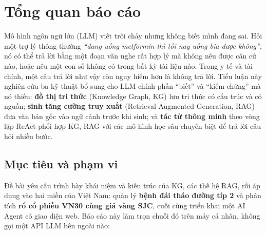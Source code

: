 \chapter*{Tổng quan báo cáo}

Mô hình ngôn ngữ lớn (LLM) viết trôi chảy nhưng không biết mình đang sai. Hỏi một trợ lý thông thường
\emph{``đang uống metformin thì tối nay uống bia được không''}, nó có thể trả lời bằng một đoạn văn nghe rất hợp
lý mà không nêu được căn cứ nào, hoặc nêu một con số không có trong bất kỳ tài liệu nào. Trong y tế và tài
chính, một câu trả lời như vậy còn nguy hiểm hơn là không trả lời. Tiểu luận này nghiên cứu ba kỹ thuật bổ sung
cho LLM chính phần ``biết'' và ``kiểm chứng'' mà nó thiếu: \textbf{đồ thị tri thức} (Knowledge Graph, KG) lưu tri
thức có cấu trúc và có nguồn; \textbf{sinh tăng cường truy xuất} (Retrieval-Augmented Generation, RAG) đưa văn
bản gốc vào ngữ cảnh trước khi sinh; và \textbf{tác tử thông minh} theo vòng lặp ReAct phối hợp KG, RAG với các
mô hình học sâu chuyên biệt để trả lời câu hỏi nhiều bước.

\section*{Mục tiêu và phạm vi}
Đề bài yêu cầu trình bày khái niệm và kiến trúc của KG, các thế hệ RAG, rồi áp dụng vào hai miền của Việt Nam:
quản lý \textbf{bệnh đái tháo đường típ 2} và phân tích \textbf{rổ cổ phiếu VN30 cùng giá vàng SJC}, cuối cùng
triển khai một AI Agent có giao diện web. Báo cáo này làm trọn chuỗi đó trên máy cá nhân, không gọi một API
LLM bên ngoài nào:


